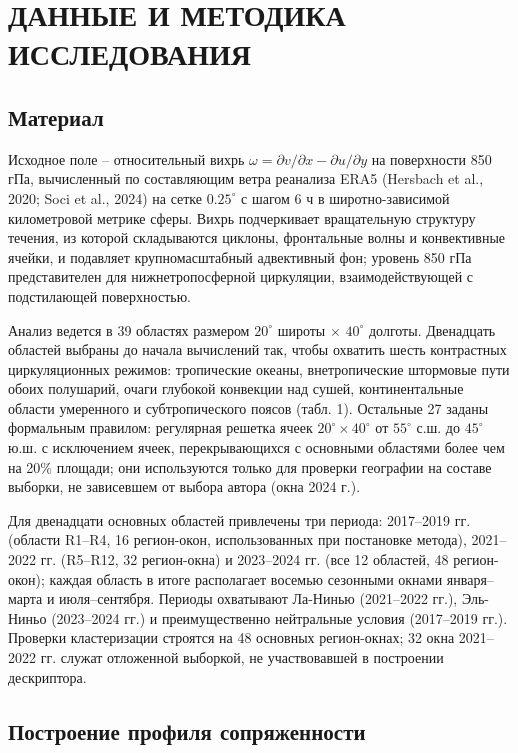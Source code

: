 \documentclass[12pt,a4paper]{article}
\begin{document}
\section{ДАННЫЕ И МЕТОДИКА ИССЛЕДОВАНИЯ}

\subsection{Материал}

Исходное поле -- относительный вихрь $\omega = \partial v/\partial x - \partial u/\partial y$ на поверхности 850 гПа, вычисленный по составляющим ветра реанализа ERA5 (Hersbach et al., 2020; Soci et al., 2024) на сетке $0.25^\circ$ с шагом 6 ч в широтно-зависимой километровой метрике сферы. Вихрь подчеркивает вращательную структуру течения, из которой складываются циклоны, фронтальные волны и конвективные ячейки, и подавляет крупномасштабный адвективный фон; уровень 850 гПа представителен для нижнетропосферной циркуляции, взаимодействующей с подстилающей поверхностью.

Анализ ведется в 39 областях размером $20^\circ$ широты $\times$ $40^\circ$ долготы. Двенадцать областей выбраны до начала вычислений так, чтобы охватить шесть контрастных циркуляционных режимов: тропические океаны, внетропические штормовые пути обоих полушарий, очаги глубокой конвекции над сушей, континентальные области умеренного и субтропического поясов (табл. 1). Остальные 27 заданы формальным правилом: регулярная решетка ячеек $20^\circ \times 40^\circ$ от $55^\circ$ с.ш. до $45^\circ$ ю.ш. с исключением ячеек, перекрывающихся с основными областями более чем на 20\% площади; они используются только для проверки географии на составе выборки, не зависевшем от выбора автора (окна 2024 г.).

Для двенадцати основных областей привлечены три периода: 2017--2019 гг. (области R1--R4, 16 регион-окон, использованных при постановке метода), 2021--2022 гг. (R5--R12, 32 регион-окна) и 2023--2024 гг. (все 12 областей, 48 регион-окон); каждая область в итоге располагает восемью сезонными окнами января--марта и июля--сентября. Периоды охватывают Ла-Нинью (2021--2022 гг.), Эль-Ниньо (2023--2024 гг.) и преимущественно нейтральные условия (2017--2019 гг.). Проверки кластеризации строятся на 48 основных регион-окнах; 32 окна 2021--2022 гг. служат отложенной выборкой, не участвовавшей в построении дескриптора.

\subsection{Построение профиля сопряженности}
\end{document}
